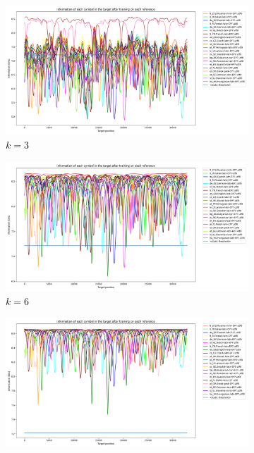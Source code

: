 \documentclass{article}
\begin{document}
\begin{figure}
    \begin{subfigure}[b]{0.3\textwidth}
        \begin{center}
            \includegraphics[width=1.0\linewidth]{../results/all_languages_random/-p_c:1:3.png}
        \end{center}
        \caption{$k = 3$}
        \label{fig:all_languages_random_p_c:1:3}
    \end{subfigure}
    \hfill
    \begin{subfigure}[b]{0.3\textwidth}
        \begin{center}
            \includegraphics[width=1.0\linewidth]{../results/all_languages_random/-p_c:1:6.png}
        \end{center}
        \caption{$k = 6$}
        \label{fig:all_languages_random_p_c:1:6}
    \end{subfigure}
    \hfill
    \begin{subfigure}[b]{0.3\textwidth}
        \begin{center}
            \includegraphics[width=1.0\linewidth]{../results/all_languages_random/-p_c:1:9.png}

\end{center}
\end{subfigure}
\end{figure}
\end{document}
